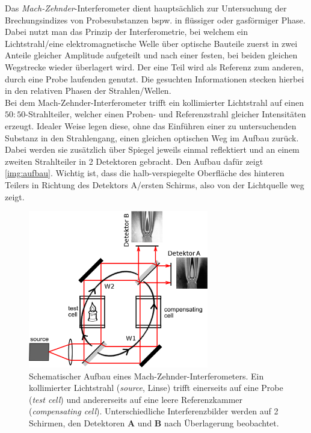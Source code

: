 \documentclass[numbers=noenddot,a4paper,notitlepage,twoside,BCOR15mm]{scrartcl}
\newcommand{\tilt}[1]{\textit{#1}}
\newcommand{\fett}[1]{\textbf{#1}}
\begin{document}
		Das \tilt{Mach-Zehnder}-Interferometer dient hauptsächlich zur Untersuchung der Brechungsindizes von Probesubstanzen bspw. in flüssiger oder gasförmiger Phase. Dabei nutzt man das Prinzip der Interferometrie, bei welchem ein Lichtstrahl/eine elektromagnetische Welle über optische Bauteile zuerst in zwei Anteile gleicher Amplitude aufgeteilt und nach einer festen, bei beiden gleichen Wegstrecke wieder überlagert wird. Der eine Teil wird als Referenz zum anderen, durch eine Probe laufenden genutzt. Die gesuchten Informationen stecken hierbei in den relativen Phasen der Strahlen/Wellen.\\
		Bei dem Mach-Zehnder-Interferometer trifft ein kollimierter Lichtstrahl auf einen $50:50$-Strahlteiler, welcher einen Proben- und Referenzstrahl gleicher Intensitäten erzeugt. Idealer Weise legen diese, ohne das Einführen einer zu untersuchenden Substanz in den Strahlengang, einen gleichen optischen Weg im Aufbau zurück. Dabei werden sie zusätzlich über Spiegel jeweils einmal reflektiert und an einem zweiten Strahlteiler in 2 Detektoren gebracht. Den Aufbau dafür zeigt \autoref{img:aufbau}. Wichtig ist, dass die halb-verspiegelte Oberfläche des hinteren Teilers in Richtung des Detektors A/ersten Schirms, also von der Lichtquelle weg zeigt.

			\begin{figure}[H]
				\centering
				\includegraphics[width=0.7\textwidth]{Mach_Zehnder_interferometer.png}
				\caption{Schematischer Aufbau eines Mach-Zehnder-Interferometers. Ein kollimierter Lichtstrahl (\tilt{source}, Linse) trifft einerseits auf eine Probe (\tilt{test cell}) und andererseits auf eine leere Referenzkammer (\tilt{compensating cell}). Unterschiedliche Interferenzbilder werden auf 2 Schirmen, den Detektoren \fett{A} und \fett{B} nach Überlagerung beobachtet. \cite{WikiMZInt}}
				\label{img:aufbau}
			\end{figure}
\end{document}
